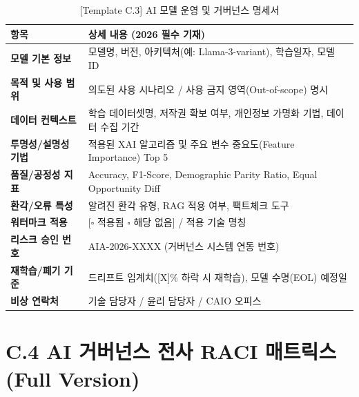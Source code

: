\begin{table}[htbp]
\centering
\caption{[Template C.3] AI 모델 운영 및 거버넌스 명세서}
\begin{tabularx}{\textwidth}{|p{3.5cm}|X|}
\hline
\textbf{항목} & \textbf{상세 내용 (2026 필수 기재)} \\ \hline
\textbf{모델 기본 정보} & 모델명, 버전, 아키텍처(예: Llama-3-variant), 학습일자, 모델 ID \\ \hline
\textbf{목적 및 사용 범위} & 의도된 사용 시나리오 / 사용 금지 영역(Out-of-scope) 명시 \\ \hline
\textbf{데이터 컨텍스트} & 학습 데이터셋명, 저작권 확보 여부, 개인정보 가명화 기법, 데이터 수집 기간 \\ \hline
\textbf{투명성/설명성 기법} & 적용된 XAI 알고리즘 및 주요 변수 중요도(Feature Importance) Top 5 \\ \hline
\textbf{품질/공정성 지표} & Accuracy, F1-Score, Demographic Parity Ratio, Equal Opportunity Diff \\ \hline
\textbf{환각/오류 특성} & 알려진 환각 유형, RAG 적용 여부, 팩트체크 도구 \\ \hline
\textbf{워터마크 적용} & [$\square$ 적용됨 $\square$ 해당 없음] / 적용 기술 명칭 \\ \hline
\textbf{리스크 승인 번호} & AIA-2026-XXXX (거버넌스 시스템 연동 번호) \\ \hline
\textbf{재학습/폐기 기준} & 드리프트 임계치([X]\% 하락 시 재학습), 모델 수명(EOL) 예정일 \\ \hline
\textbf{비상 연락처} & 기술 담당자 / 윤리 담당자 / CAIO 오피스 \\ \hline
\end{tabularx}
\end{table}

\section*{C.4 AI 거버넌스 전사 RACI 매트릭스 (Full Version)}

